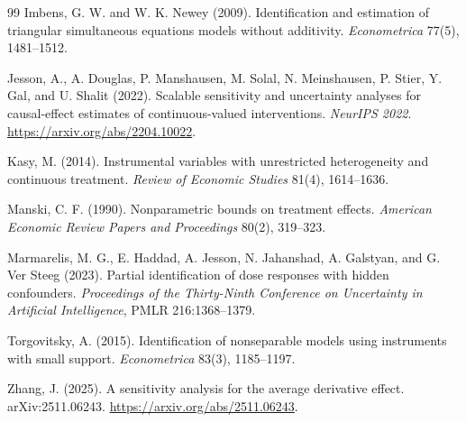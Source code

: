\documentclass[11pt]{article}
\theoremstyle{definition}
\theoremstyle{plain}
\theoremstyle{remark}
\begin{document}
\begin{thebibliography}{99}
Imbens, G. W. and W. K. Newey (2009).
\newblock Identification and estimation of triangular simultaneous equations models without additivity.
\newblock \emph{Econometrica} 77(5), 1481--1512.

Jesson, A., A. Douglas, P. Manshausen, M. Solal, N. Meinshausen, P. Stier, Y. Gal, and U. Shalit (2022).
\newblock Scalable sensitivity and uncertainty analyses for causal-effect estimates of continuous-valued interventions.
\newblock \emph{NeurIPS 2022}. \url{https://arxiv.org/abs/2204.10022}.

Kasy, M. (2014).
\newblock Instrumental variables with unrestricted heterogeneity and continuous treatment.
\newblock \emph{Review of Economic Studies} 81(4), 1614--1636.

Manski, C. F. (1990).
\newblock Nonparametric bounds on treatment effects.
\newblock \emph{American Economic Review Papers and Proceedings} 80(2), 319--323.

Marmarelis, M. G., E. Haddad, A. Jesson, N. Jahanshad, A. Galstyan, and G. Ver Steeg (2023).
\newblock Partial identification of dose responses with hidden confounders.
\newblock \emph{Proceedings of the Thirty-Ninth Conference on Uncertainty in Artificial Intelligence}, PMLR 216:1368--1379.

Torgovitsky, A. (2015).
\newblock Identification of nonseparable models using instruments with small support.
\newblock \emph{Econometrica} 83(3), 1185--1197.

Zhang, J. (2025).
\newblock A sensitivity analysis for the average derivative effect.
\newblock arXiv:2511.06243. \url{https://arxiv.org/abs/2511.06243}.

\end{thebibliography}
\end{document}
